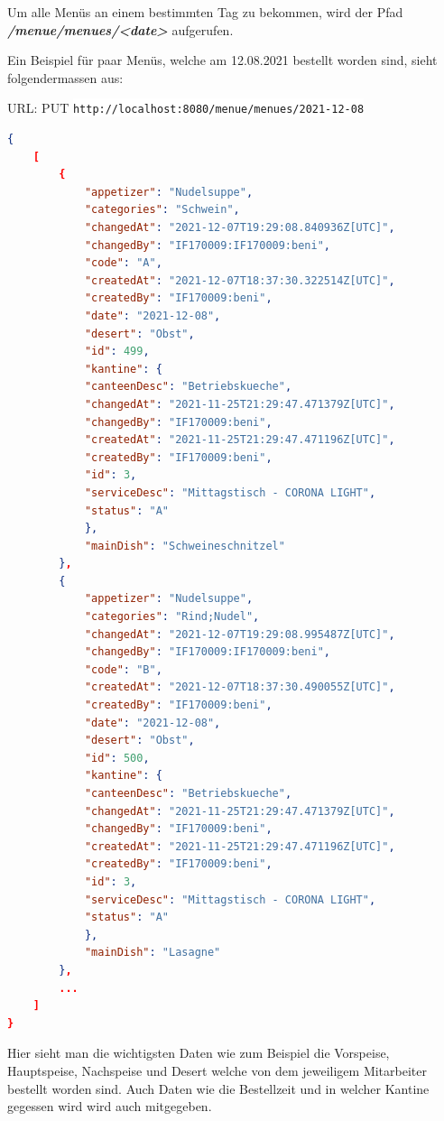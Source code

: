 Um alle Menüs an einem bestimmten Tag zu bekommen, wird der Pfad \textbf{\textit{/menue/menues/<date>}} aufgerufen.

Ein Beispiel für paar Menüs, welche am 12.08.2021 bestellt worden sind, sieht folgendermassen aus:

URL: PUT \colorbox{white}{\lstinline[basicstyle=\ttfamily\color{black},language=html]|http://localhost:8080/menue/menues/2021-12-08|}


\begin{lstlisting}[language=json,firstnumber=1]
{
    [
        {
            "appetizer": "Nudelsuppe",
            "categories": "Schwein",
            "changedAt": "2021-12-07T19:29:08.840936Z[UTC]",
            "changedBy": "IF170009:IF170009:beni",
            "code": "A",
            "createdAt": "2021-12-07T18:37:30.322514Z[UTC]",
            "createdBy": "IF170009:beni",
            "date": "2021-12-08",
            "desert": "Obst",
            "id": 499,
            "kantine": {
            "canteenDesc": "Betriebskueche",
            "changedAt": "2021-11-25T21:29:47.471379Z[UTC]",
            "changedBy": "IF170009:beni",
            "createdAt": "2021-11-25T21:29:47.471196Z[UTC]",
            "createdBy": "IF170009:beni",
            "id": 3,
            "serviceDesc": "Mittagstisch - CORONA LIGHT",
            "status": "A"
            },
            "mainDish": "Schweineschnitzel"
        },
        {
            "appetizer": "Nudelsuppe",
            "categories": "Rind;Nudel",
            "changedAt": "2021-12-07T19:29:08.995487Z[UTC]",
            "changedBy": "IF170009:IF170009:beni",
            "code": "B",
            "createdAt": "2021-12-07T18:37:30.490055Z[UTC]",
            "createdBy": "IF170009:beni",
            "date": "2021-12-08",
            "desert": "Obst",
            "id": 500,
            "kantine": {
            "canteenDesc": "Betriebskueche",
            "changedAt": "2021-11-25T21:29:47.471379Z[UTC]",
            "changedBy": "IF170009:beni",
            "createdAt": "2021-11-25T21:29:47.471196Z[UTC]",
            "createdBy": "IF170009:beni",
            "id": 3,
            "serviceDesc": "Mittagstisch - CORONA LIGHT",
            "status": "A"
            },
            "mainDish": "Lasagne"
        },
        ...
    ]
}
\end{lstlisting}

Hier sieht man die wichtigsten Daten wie zum Beispiel die Vorspeise, Hauptspeise, Nachspeise und Desert welche von dem jeweiligem Mitarbeiter bestellt worden sind. 
Auch Daten wie die Bestellzeit und in welcher Kantine gegessen wird wird auch mitgegeben.

